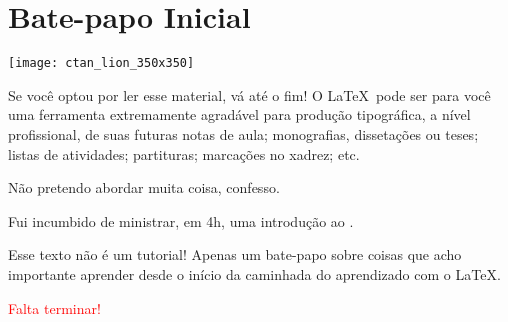 \thispagestyle{empty}

\section*{Bate-papo Inicial}

\begin{marginfigure}
  \centering
  \texttt{[image: ctan\_lion\_350x350]}
\end{marginfigure}

Se você optou por ler esse material, vá até o fim!
O \LaTeX\ pode ser para você uma ferramenta extremamente agradável para produção
tipográfica, a nível profissional, de suas futuras notas de aula; monografias,
dissetações ou teses; listas de atividades; partituras; marcações no xadrez; etc.

Não pretendo abordar muita coisa, confesso.

Fui incumbido de ministrar, em 4\unit{\hour}, uma introdução ao .

Esse texto não é um tutorial!
Apenas um bate-papo sobre coisas que acho importante aprender desde o início da 
caminhada do aprendizado com o \LaTeX.

\textcolor{red}{Falta terminar!}

\newpage